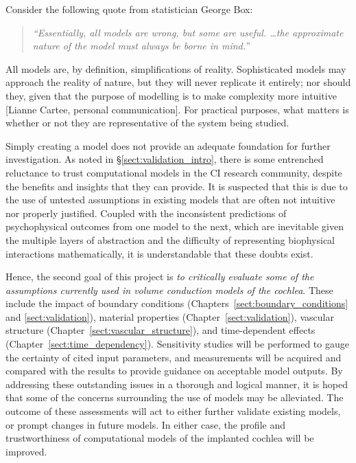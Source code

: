 Consider the following quote from statistician George Box: 

\begin{verse}

	\textit{
		``Essentially, all models are wrong, but some are useful. \hphantom{This is
		some filler text} \ldots the approximate nature of the model must always be
		borne in mind.'' }

 	\vspace{4mm}
\end{verse}

All models are, by definition, simplifications of reality. Sophisticated models
may approach the reality of nature, but they will never replicate it entirely;
nor should they, given that the purpose of modelling is to make complexity more
intuitive [Lianne Cartee, personal communication]. For practical purposes, what
matters is whether or not they are representative of the system being studied.

Simply creating a model does not provide an adequate foundation for further
investigation. As noted in \S\ref{sect:validation_intro}, there is some
entrenched reluctance to trust computational models in the CI research
community, despite the benefits and insights that they can provide. It is
suspected that this is due to the use of untested assumptions in existing models
that are often not intuitive nor properly justified. Coupled with the
inconsistent predictions of psychophysical outcomes from one model to the next,
which are inevitable given the multiple layers of abstraction and the difficulty
of representing biophysical interactions mathematically, it is understandable
that these doubts exist.

Hence, the second goal of this project is \emph{to critically evaluate some of
the assumptions currently used in volume conduction models of the cochlea}.
These include the impact of boundary conditions
(Chapters~\ref{sect:boundary_conditions} and \ref{sect:validation}), material
properties (Chapter~\ref{sect:validation}), vascular structure
(Chapter~\ref{sect:vascular_structure}), and time-dependent effects
(Chapter~\ref{sect:time_dependency}). Sensitivity studies will be performed to
gauge the certainty of cited input parameters, and \invivo{} measurements will
be acquired and compared with the \insilico{} results to provide guidance on
acceptable model outputs. By addressing these outstanding issues in a thorough
and logical manner, it is hoped that some of the concerns surrounding the use of
\insilico{} models may be alleviated. The outcome of these assessments will act
to either further validate existing models, or prompt changes in future models.
In either case, the profile and trustworthiness of computational models of the
implanted cochlea will be improved.



